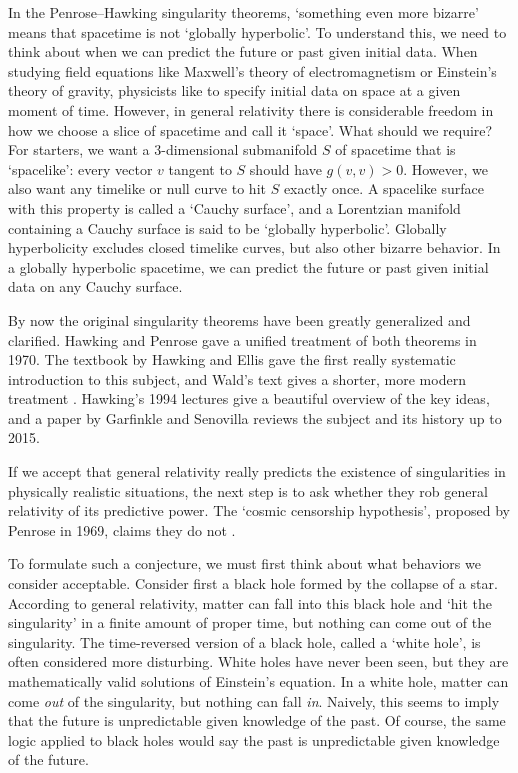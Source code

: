 \documentclass{article}
\begin{document}
In the Penrose--Hawking singularity theorems, `something even more bizarre' means that spacetime is not `globally hyperbolic'.  To understand this, we need to think about when we can predict the future or past given initial data.  When studying field equations like Maxwell's theory of electromagnetism or Einstein's theory of gravity, physicists like to specify initial data on space at a given moment of time.  However, in general relativity there is considerable freedom in how we choose a slice of spacetime and call it `space'.   What should we require?   For starters, we want a 3-dimensional submanifold $S$ of spacetime that is `spacelike': every vector $v$ tangent to $S$ should have $g(v,v) > 0$.   However, we also want any timelike or null curve to hit $S$ exactly once.  A spacelike surface with this property is called a `Cauchy surface', and a Lorentzian manifold containing a Cauchy surface is said to be `globally hyperbolic'.   Globally hyperbolicity excludes closed timelike curves, but also other bizarre behavior.  In a globally hyperbolic spacetime, we can predict the future or past given initial data on any Cauchy surface.  

By now the original singularity theorems have been greatly generalized and clarified.  Hawking and Penrose \cite{HawkingPenrose1970} gave a unified treatment of both theorems in 1970.  The textbook by Hawking and Ellis \cite{HawkingEllis} gave the first
really systematic introduction to this subject, and Wald's text gives a shorter, 
more modern treatment \cite{Wald1984}.  Hawking's 1994 lectures \cite{Hawking1994} give a beautiful overview of the key ideas, and a paper by Garfinkle and Senovilla \cite{Hawking1994} reviews the subject and its history up to 2015.   

If we accept that general relativity really predicts the existence of singularities in physically realistic situations, the next step is to ask whether they rob general relativity of its predictive power.  The `cosmic censorship hypothesis', proposed by Penrose in 1969, claims they do not \cite{Penrose1969}.   

To formulate such a conjecture, we must first think about what behaviors we consider acceptable.  Consider first a black hole formed by the collapse of a star.  According to general relativity, matter can fall into this black hole and `hit the singularity' in a finite amount of proper time, but nothing can come out of the singularity.  The time-reversed version of a black hole, called a `white hole', is often considered more disturbing.  White holes have never been seen, but they are mathematically valid solutions of Einstein's equation.  In a white hole, matter can come \emph{out} of the singularity, but nothing can fall \emph{in}.    Naively, this seems to imply that the future is unpredictable given knowledge of the past.   Of course, the same logic applied to black holes would say the past is unpredictable given knowledge of the future.
\end{document}

